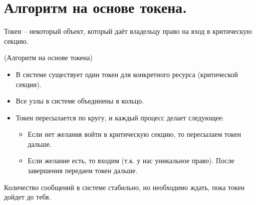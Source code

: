 \section{Алгоритм на основе токена.}

\begin{definition}
    Токен -- некоторый объект, который даёт владельцу право на вход в 
    критическую секцию.
\end{definition}

\begin{algorithm}(Алгоритм на основе токена)
\begin{itemize}
    \item В системе существует один токен для конкретного ресурса (критической секции).
    \item Все узлы в системе объединены в кольцо.
    \item Токен пересылается по кругу, и каждый процесс делает следующее:
        \begin{itemize}
            \item Если нет желания войти в критическую секцию, то пересылаем токен 
                дальше.
            \item Если желание есть, то входим (т.к. у нас уникальное право).
                После завершения передаем токен дальше.
        \end{itemize}
\end{itemize}
\end{algorithm}

\begin{remark}
    Количество сообщений в системе стабильно, но необходимо ждать, пока токен 
    дойдет до тебя.
\end{remark}
